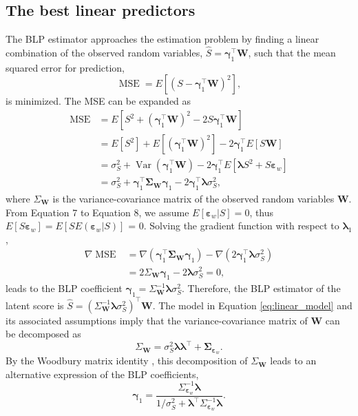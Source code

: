 \documentclass[man, floatsintext]{apa7}
\newcommand{\mbf}[1]{\bm{#1}}
\newcommand{\bgamma}{\mbf{\gamma}}
\newcommand{\blambda}{\mbf{\lambda}}
\newcommand{\bW}{\mbf{W}}
\newcommand{\bsigma}{\mbf{\Sigma}}
\DeclareMathOperator{\MSE}{MSE}
\DeclareMathOperator{\Var}{Var}
\begin{document}
  \subsection{The best linear predictors}
  The BLP estimator approaches the estimation problem by finding a linear
  combination of the observed random variables, $\hat{S} = \bgamma_1^\top
  \bW$, such that the mean squared error for prediction,
  \begin{equation}
  \label{eq:MSE}
    \MSE = E[(S - \bgamma_1^\top \bW )^2],
  \end{equation}
  is minimized. The MSE can be expanded as
  \begin{align}
    \MSE &= E[S^2 + (\bgamma_1^\top \bW)^2 - 2S\bgamma_1^\top \bW]\\
    &= E[S^2] + E[(\bgamma_1^\top \bW)^2] - 2\bgamma_1^\top E[S\bW]\\
    &= \sigma_S^2 + \Var(\bgamma_1^\top \bW) - 2\bgamma_1^\top E[\blambda S^2 +
    S\mbf{\varepsilon}_w]\\
    &= \sigma_S^2 + \bgamma_1^\top \bsigma_{\bW} \bgamma_1 - 2\bgamma_1^\top
    \blambda \sigma_S^2,
  \end{align}
  where $\Sigma_{\bW}$ is the variance-covariance matrix of the observed random
  variables $\bW$.
  From Equation 7 to Equation 8, we assume $E[\mbf{\varepsilon}_w|S] = 0$,
  thus $E[S\mbf{\varepsilon}_w] = E[S E(\mbf{\varepsilon}_w|S)]$ = 0. Solving
  the gradient function with respect to $\blambda_1$,
  \begin{align}
    \nabla \MSE &= \nabla(\bgamma_1^\top \bsigma_{\bW} \bgamma_1)  - \nabla
    (2\bgamma_1^\top \blambda \sigma_S^2) \\
    &= 2\Sigma_{\bW} \bgamma_1 - 2 \blambda \sigma_S^2 = 0,
  \end{align}
  leads to the BLP coefficient $\bgamma_1 = \Sigma_{\bW}^{-1} \blambda
  \sigma_S^2$.
  Therefore, the BLP estimator of the latent score is $\hat{S} = (\Sigma_{\bW}^
  {-1} \blambda\sigma_S^2)^\top \bW$. The model in Equation 
  \ref{eq:linear_model} and its associated assumptions imply that the
  variance-covariance matrix of $\bW$ can be decomposed as
  \begin{equation}
  \label{eq:cov_decomp}
    \Sigma_{\bW} = \sigma_S^2\blambda\blambda^\top + \bsigma_{\mbf{\varepsilon}_w}.
  \end{equation}
  By the Woodbury matrix identity \parencite{Fill1999}, this decomposition of
  $\Sigma_{\bW}$ leads to an alternative expression of the BLP coefficients,
  \begin{equation}
    \bgamma_1 = \frac{\Sigma_{\mbf{\varepsilon}_w}^{-1}\blambda}{1/\sigma_S^2 +
    \blambda^\top\Sigma_{\mbf{\varepsilon}_w}^{-1}\blambda}.
  \end{equation}
\end{document}
